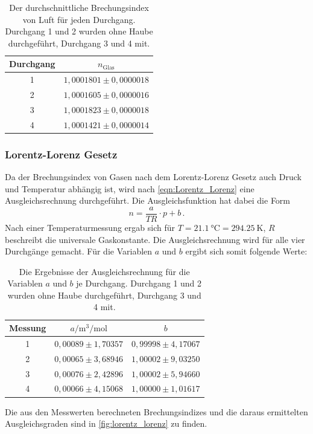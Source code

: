 \begin{table}[H]
  \centering
  \caption{Der durchschnittliche Brechungsindex von Luft für jeden Durchgang. Durchgang 1 und 2 wurden ohne Haube durchgeführt, Durchgang 3 und 4 mit.}
  \label{tab:n_luft_mean}
  \begin{tabular}{c c}
    \toprule
    Durchgang & $n_\text{Glas}$ \\
    \midrule
    1    &  $1,0001801 \pm 0,0000018$ \\   
    2    &  $1,0001605 \pm 0,0000016$ \\   
    3    &  $1,0001823 \pm 0,0000018$ \\   
    4    &  $1,0001421 \pm 0,0000014$ \\   
    \bottomrule
  \end{tabular}
\end{table}

\subsubsection{Lorentz-Lorenz Gesetz}
Da der Brechungsindex von Gasen nach dem Lorentz-Lorenz Gesetz auch Druck und Temperatur abhängig ist, wird nach \autoref{eqn:Lorentz_Lorenz} eine Ausgleichsrechnung durchgeführt.
Die Ausgleichsfunktion hat dabei die Form
\begin{equation*}
  n = \frac{a}{TR} \cdot p + b \, .
\end{equation*}
Nach einer Temperaturmessung ergab sich für $T = \SI{21.1}{\celsius} = \SI{294.25}{\kelvin}$, $R$ beschreibt die universale Gaskonstante.
Die Ausgleichsrechnung wird für alle vier Durchgänge gemacht.
Für die Variablen $a$ und $b$ ergibt sich somit folgende Werte:
\begin{table}[H]
  \centering
  \caption{Die Ergebnisse der Ausgleichsrechnung für die Variablen $a$ und $b$ je Durchgang. Durchgang 1 und 2 wurden ohne Haube durchgeführt, Durchgang 3 und 4 mit.}
   \begin{tabular}{c c c}
    \toprule
    Messung & $a / \si{\cubic\metre\per\mole}$ & $b$ \\
    \midrule
    1    &  $0,00089 \pm 1,70357$ & $0,99998 \pm 4,17067$ \\   
    2    &  $0,00065 \pm 3,68946$ & $1,00002 \pm 9,03250$ \\   
    3    &  $0,00076 \pm 2,42896$ & $1,00002 \pm 5,94660$ \\   
    4    &  $0,00066 \pm 4,15068$ & $1,00000 \pm 1,01617$ \\
    \bottomrule
  \end{tabular}
\end{table}
\noindent
Die aus den Messwerten berechneten Brechungsindizes und die daraus ermittelten Ausgleichsgraden sind in \autoref{fig:lorentz_lorenz} zu finden.

